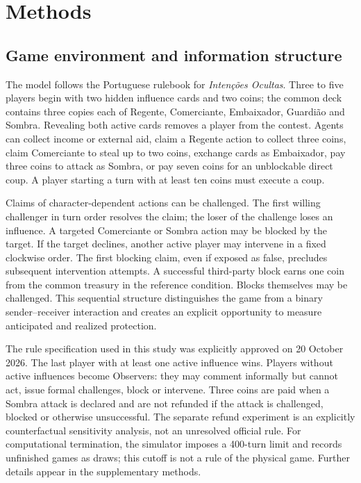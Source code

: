 \documentclass[11pt,a4paper]{article}
\begin{document}
\section{Methods}
\subsection{Game environment and information structure}
The model follows the Portuguese rulebook for \emph{Inten\c{c}\~oes Ocultas}. Three to five players begin with two hidden influence cards and two coins; the common deck contains three copies each of Regente, Comerciante, Embaixador, Guardi\~ao and Sombra. Revealing both active cards removes a player from the contest. Agents can collect income or external aid, claim a Regente action to collect three coins, claim Comerciante to steal up to two coins, exchange cards as Embaixador, pay three coins to attack as Sombra, or pay seven coins for an unblockable direct coup. A player starting a turn with at least ten coins must execute a coup.

Claims of character-dependent actions can be challenged. The first willing challenger in turn order resolves the claim; the loser of the challenge loses an influence. A targeted Comerciante or Sombra action may be blocked by the target. If the target declines, another active player may intervene in a fixed clockwise order. The first blocking claim, even if exposed as false, precludes subsequent intervention attempts. A successful third-party block earns one coin from the common treasury in the reference condition. Blocks themselves may be challenged. This sequential structure distinguishes the game from a binary sender--receiver interaction and creates an explicit opportunity to measure anticipated and realized protection.

The rule specification used in this study was explicitly approved on 20 October 2026. The last player with at least one active influence wins. Players without active influences become Observers: they may comment informally but cannot act, issue formal challenges, block or intervene. Three coins are paid when a Sombra attack is declared and are not refunded if the attack is challenged, blocked or otherwise unsuccessful. The separate refund experiment is an explicitly counterfactual sensitivity analysis, not an unresolved official rule. For computational termination, the simulator imposes a 400-turn limit and records unfinished games as draws; this cutoff is not a rule of the physical game. Further details appear in the supplementary methods.
\end{document}
